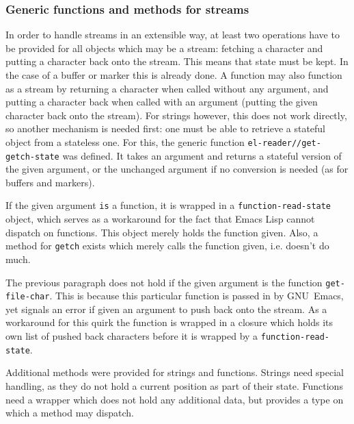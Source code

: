 \documentclass[a4paper,10pt,twoside]{report}
\newcommand{\el}{Emacs Lisp}
\newcommand{\sym}[1]{\texttt{#1}}
\newcommand{\fun}[1]{\texttt{#1}}
\newcommand{\emacs}{GNU~Emacs}
\begin{document}
\subsubsection{Generic functions and methods for streams}
\label{subsubsec:multimethods-streams}

In order to handle streams in an extensible way, at least two operations have to
be provided for all objects which may be a stream: fetching a character and
putting a character back onto the stream.  This means that state must be kept.
In the case of a buffer or marker this is already done.  A function may also
function as a stream by returning a character when called without any argument,
and putting a character back when called with an argument (putting the given
character back onto the stream).  For strings however, this does not work
directly, so another mechanism is needed first: one must be able to retrieve a
stateful object from a stateless one.  For this, the generic function
\fun{el-reader//get-getch-state} was defined.  It takes an argument and returns
a stateful version of the given argument, or the unchanged argument if no
conversion is needed (as for buffers and markers).


If the given argument \texttt{is} a function, it is wrapped in a
\sym{function-read-state} object, which serves as a workaround for
the fact that \el{} cannot dispatch on functions.  This object merely holds the
function given.  Also, a method for \fun{getch} exists which merely
calls the function given, i.e. doesn't do much.

The previous paragraph does not hold if the given argument is the function
\fun{get-file-char}.  This is because this particular function is passed in by
\emacs{}, yet signals an error if given an argument to push back onto the
stream.  As a workaround for this quirk the function is wrapped in a closure
which holds its own list of pushed back characters before it is wrapped by a
\sym{function-read-state}.

Additional methods were provided for strings and functions.  Strings need
special handling, as they do not hold a current position as part of their
state.  Functions need a wrapper which does not hold any additional data, but
provides a type on which a method may dispatch.
\end{document}
